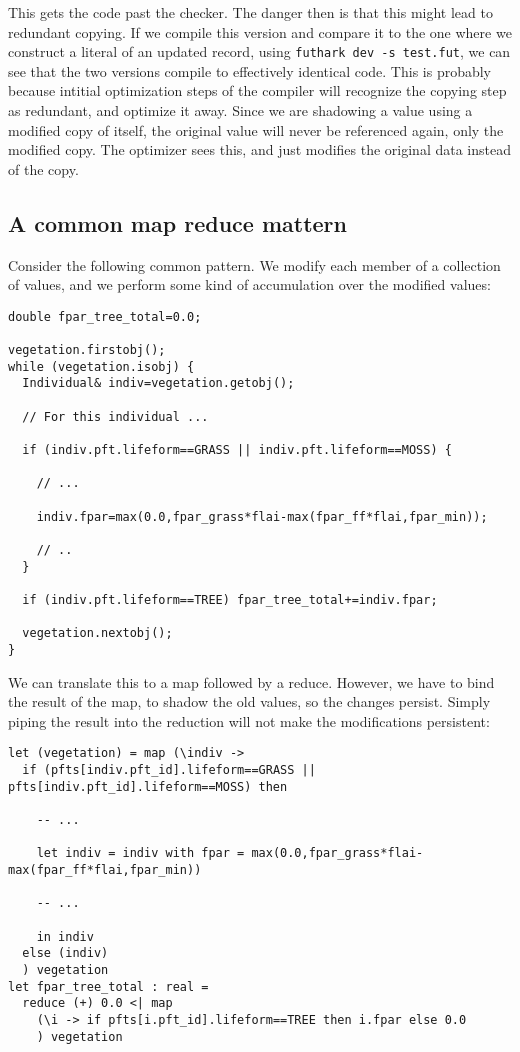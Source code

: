 This gets the code past the checker. The danger then is that this might lead to redundant copying. If we compile this version and compare it to the one where we construct a literal of an updated record, using \texttt{futhark dev -s test.fut}, we can see that the two versions compile to effectively identical code. This is probably because intitial optimization steps of the compiler will recognize the copying step as redundant, and optimize it away. Since we are shadowing a value using a modified copy of itself, the original value will never be referenced again, only the modified copy. The optimizer sees this, and just modifies the original data instead of the copy.

\subsection{A common map reduce mattern}

Consider the following common pattern. We modify each member of a collection of values, and we perform some kind of accumulation over the modified values:
\begin{verbatim}
double fpar_tree_total=0.0;

vegetation.firstobj();
while (vegetation.isobj) {
  Individual& indiv=vegetation.getobj();

  // For this individual ...

  if (indiv.pft.lifeform==GRASS || indiv.pft.lifeform==MOSS) {

    // ...

    indiv.fpar=max(0.0,fpar_grass*flai-max(fpar_ff*flai,fpar_min));

    // ..
  }

  if (indiv.pft.lifeform==TREE) fpar_tree_total+=indiv.fpar;

  vegetation.nextobj();
}
\end{verbatim}

We can translate this to a map followed by a reduce. However, we have to bind the result of the map, to shadow the old values, so the changes persist. Simply piping the result into the reduction will not make the modifications persistent:

\begin{verbatim}
let (vegetation) = map (\indiv ->
  if (pfts[indiv.pft_id].lifeform==GRASS || pfts[indiv.pft_id].lifeform==MOSS) then

    -- ...

    let indiv = indiv with fpar = max(0.0,fpar_grass*flai-max(fpar_ff*flai,fpar_min))

    -- ...

    in indiv
  else (indiv)
  ) vegetation
let fpar_tree_total : real =
  reduce (+) 0.0 <| map
    (\i -> if pfts[i.pft_id].lifeform==TREE then i.fpar else 0.0
    ) vegetation
\end{verbatim}

